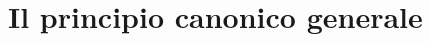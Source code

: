 \documentclass[10pt]{beamer}	%
\theoremstyle{definition}
\theoremstyle{plain}
\begin{document}
%	
%	
%	
%	
%
%

\section{Il principio canonico generale}
\end{document}
